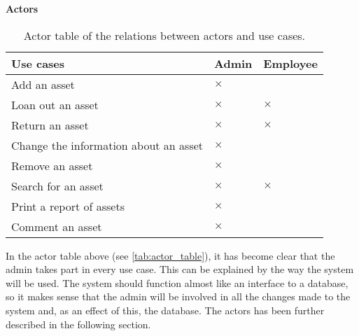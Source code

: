 \begin{table}[H]
    \centering
    \vspace{0.2cm}
    \hspace{6cm} \vspace{0.6cm} \textbf{Actors}
    \begin{tabular}{p{} || p{} p{}}
        \textbf{Use cases} & Admin & Employee \vspace{0.2cm}\\
        \hline \hline
        Add an asset & \hspace{0.34cm} $\pmb{\times}$ & \\
        \hline
        Loan out an asset & \hspace{0.34cm} $\pmb{\times}$ & \hspace{0.6cm} $\pmb{\times}$ \\
        \hline
        Return an asset & \hspace{0.34cm} $\pmb{\times}$ & \hspace{0.6cm} $\pmb{\times}$ \\
        \hline
        Change the information about an asset & \hspace{0.34cm} $\pmb{\times}$ & \\
        \hline
        Remove an asset & \hspace{0.34cm} $\pmb{\times}$ & \\
        \hline
        Search for an asset & \hspace{0.34cm} $\pmb{\times}$ & \hspace{0.6cm} $\pmb{\times}$ \\
        \hline
        Print a report of assets & \hspace{0.34cm} $\pmb{\times}$ & \\
        \hline
        Comment an asset & \hspace{0.34cm} $\pmb{\times}$ & \\
    \end{tabular}
    \vspace{0.2cm}
    \vspace{0.2cm}
    \caption{Actor table of the relations between actors and use cases.}
    \label{tab:actor_table}
\end{table}

In the actor table above (see \autoref{tab:actor_table}), it has become clear that the admin takes part in every use case. This can be explained by the way the system will be used. The system should function almost like an interface to a database, so it makes sense that the admin will be involved in all the changes made to the system and, as an effect of this, the database. The actors has been further described in the following section.